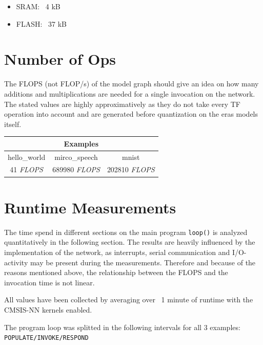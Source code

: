 \documentclass[oneside]{tum-book}
\begin{document}
\begin{itemize}
    \item SRAM: ~4 kB
    \item FLASH: ~37 kB
\end{itemize}

\section{Number of Ops}

The FLOPS (not FLOP/s) of the model graph should give an idea on how many additions and multiplications are needed for a single invocation on the network. The stated values are highly approximatively as they do not take every TF operation into account and are generated before quantization on the eras models itself.

\begin{table}[h]
\begin{tabular}{|c|c|c|}
\hline
\multicolumn{3}{|c|}{\textbf{Examples}}\\\hline
hello\_world & mirco\_speech & mnist        \\\hline
41 \textit{FLOPS}     & 689980 \textit{FLOPS}  & 202810 \textit{FLOPS}\\\hline
\end{tabular}
\end{table}

\section{Runtime Measurements}

The time spend in different sections on the main program \lstinline{loop()} is analyzed quantitatively in the following section. The results are heavily influenced by the implementation of the network, as interrupts, serial communication and I/O-activity may be present during the measurements. Therefore and because of the reasons mentioned above, the relationship between the FLOPS and the invocation time is not linear.

All values have been collected by averaging over ~1 minute of runtime with the CMSIS-NN kernels enabled.

The program loop was splitted in the following intervals for all 3 examples: \lstinline{POPULATE/INVOKE/RESPOND}
\end{document}
